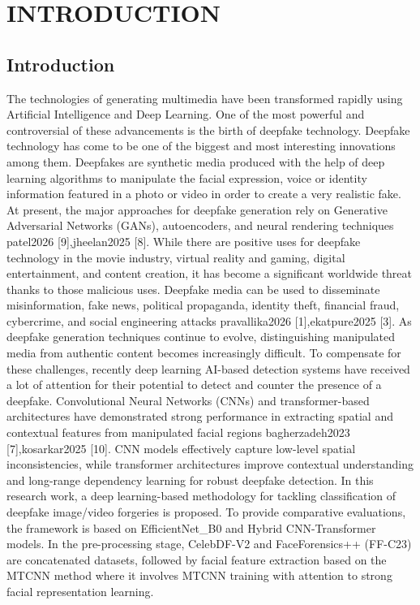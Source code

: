 \documentclass[12pt,a4paper]{report}
\begin{document}
\newpage
{} 
\chapter{INTRODUCTION}
\section{Introduction}

The technologies of generating multimedia have been transformed rapidly using Artificial Intelligence and Deep Learning. One of the most powerful and controversial of these advancements is the birth of deepfake technology. Deepfake technology has come to be one of the biggest and most interesting innovations among them. Deepfakes are synthetic media produced with the help of deep learning algorithms to manipulate the facial expression, voice or identity information featured in a photo or video in order to create a very realistic fake. At present, the major approaches for deepfake generation rely on Generative Adversarial Networks (GANs), autoencoders, and neural rendering techniques patel2026 [9],jheelan2025 [8]. While there are positive uses for deepfake technology in the movie industry, virtual reality and gaming, digital entertainment, and content creation, it has become a significant worldwide threat thanks to those malicious uses. Deepfake media can be used to disseminate misinformation, fake news, political propaganda, identity theft, financial fraud, cybercrime, and social engineering attacks pravallika2026 [1],ekatpure2025 [3]. As deepfake generation techniques continue to evolve, distinguishing manipulated media from authentic content becomes increasingly difficult. To compensate for these challenges, recently deep learning AI-based detection systems have received a lot of attention for their potential to detect and counter the presence of a deepfake. Convolutional Neural Networks (CNNs) and transformer-based architectures have demonstrated strong performance in extracting spatial and contextual features from manipulated facial regions bagherzadeh2023 [7],kosarkar2025 [10]. CNN models effectively capture low-level spatial inconsistencies, while transformer architectures improve contextual understanding and long-range dependency learning for robust deepfake detection. In this research work, a deep learning-based methodology for tackling classification of deepfake image/video forgeries is proposed. To provide comparative evaluations, the framework is based on EfficientNet\_B0 and Hybrid CNN-Transformer models. In the pre-processing stage, CelebDF-V2 and FaceForensics++ (FF-C23) are concatenated datasets, followed by facial feature extraction based on the MTCNN method where it involves MTCNN training with attention to strong facial representation learning.
\end{document}
